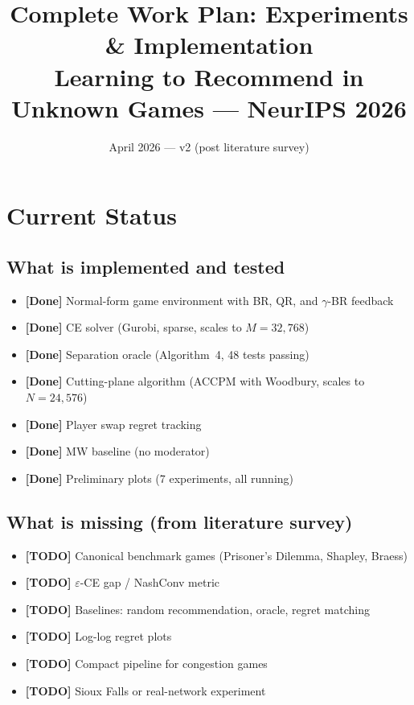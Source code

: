 \documentclass[11pt]{article}
\title{\textbf{Complete Work Plan: Experiments \& Implementation} \\ \large Learning to Recommend in Unknown Games --- NeurIPS 2026}
\author{}
\date{April 2026 --- v2 (post literature survey)}
\newcommand{\status}[1]{\textcolor{done}{\textbf{[#1]}}}
\newcommand{\TODO}[1]{\textcolor{todo}{\textbf{[#1]}}}
\begin{document}
\maketitle

\section{Current Status}

\subsection{What is implemented and tested}
\begin{itemize}[nosep]
    \item \status{Done} Normal-form game environment with BR, QR, and $\gamma$-BR feedback
    \item \status{Done} CE solver (Gurobi, sparse, scales to $M{=}32{,}768$)
    \item \status{Done} Separation oracle (Algorithm~4, 48 tests passing)
    \item \status{Done} Cutting-plane algorithm (ACCPM with Woodbury, scales to $N{=}24{,}576$)
    \item \status{Done} Player swap regret tracking
    \item \status{Done} MW baseline (no moderator)
    \item \status{Done} Preliminary plots (7 experiments, all running)
\end{itemize}

\subsection{What is missing (from literature survey)}
\begin{itemize}[nosep]
    \item \TODO{TODO} Canonical benchmark games (Prisoner's Dilemma, Shapley, Braess)
    \item \TODO{TODO} $\varepsilon$-CE gap / NashConv metric
    \item \TODO{TODO} Baselines: random recommendation, oracle, regret matching
    \item \TODO{TODO} Log-log regret plots
    \item \TODO{TODO} Compact pipeline for congestion games
    \item \TODO{TODO} Sioux Falls or real-network experiment
\end{itemize}
\end{document}
